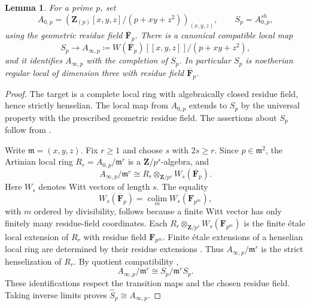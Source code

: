 \documentclass[11pt,a4paper]{amsart}
\numberwithin{equation}{section}
\newtheorem{lemma}[theorem]{Lemma}
\theoremstyle{definition}
\theoremstyle{remark}
\newcommand{\Z}{\mathbf Z}
\newcommand{\F}{\mathbf F}
\newcommand{\m}{\mathfrak m}
\newcommand{\colim}{\operatorname*{colim}}
\begin{document}
\begin{lemma}
\label{d3:lem:stricthenselcompletion}
For a prime $p$, set
\[
 A_{0,p}=\left(\Z_{(p)}[x,y,z]/(p+xy+z^2)\right)_{(x,y,z)},
 \qquad S_p=A_{0,p}^{sh},
\]
using the geometric residue field $\overline{\F}_p$.
There is a canonical compatible local map
\[
 S_p\longrightarrow
 A_{\infty,p}\coloneqq W(\overline{\F}_p)[[x,y,z]]/(p+xy+z^2),
\]
and it identifies $A_{\infty,p}$ with the completion of $S_p$.
In particular $S_p$ is noetherian regular local of dimension three
with residue field $\overline{\F}_p$.
\end{lemma}
\begin{proof}
The target is a complete local ring with algebraically closed residue
field, hence strictly henselian.  The local map from $A_{0,p}$ extends
to $S_p$ by the universal property with the prescribed geometric
residue field.  The assertions about $S_p$ follow from
\cite[Section~15.46]{StacksHenselization}.

Write $\m=(x,y,z)$.  Fix $r\geq1$ and choose $s$ with $2s\geq r$.
Since $p\in\m^2$, the Artinian local ring
$R_r=A_{0,p}/\m^r$ is a $\Z/p^s$-algebra, and
\[
 A_{\infty,p}/\m^r
 \cong R_r\otimes_{\Z/p^s}W_s(\overline{\F}_p).
\]
Here $W_s$ denotes Witt vectors of length $s$.  The equality
\[
 W_s(\overline{\F}_p)=\colim_m W_s(\F_{p^m}),
\]
with $m$ ordered by divisibility, follows because a finite Witt vector
has only finitely many residue-field coordinates.  Each
$R_r\otimes_{\Z/p^s}W_s(\F_{p^m})$ is the finite \'etale local extension
of $R_r$ with residue field $\F_{p^m}$.
Finite \'etale extensions of a henselian local ring are determined by
their residue extensions \cite[Tag~04GK]{StacksHenselization}.
Thus $A_{\infty,p}/\m^r$ is the strict henselization of $R_r$.
By quotient compatibility
\cite[Section~10.156, Lemma~10.156.4]{StacksHenselization},
\[
 A_{\infty,p}/\m^r\cong S_p/\m^rS_p.
\]
These identifications respect the transition maps and the chosen
residue field.  Taking inverse limits proves
$\widehat S_p\cong A_{\infty,p}$.
\end{proof}
\end{document}
